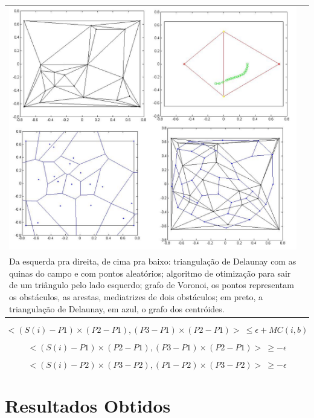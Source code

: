 \documentclass[a4paper,12pt]{article}
\begin{document}
\begin{tabular}{p{15cm} p{7cm}}
    \vspace{0pt} 
    \label{fig: milp}
	\includegraphics[width=1\textwidth]{figures/allmilp.png}
    \vspace{0pt}\\
    Da esquerda pra direita, de cima pra baixo: triangulação de Delaunay com as quinas do campo e com pontos aleatórios; algoritmo de otimização para sair de um triângulo pelo lado esquerdo; grafo de Voronoi, os pontos representam os obstáculos, as arestas, mediatrizes de dois obstáculos; em preto, a triangulação de Delaunay, em azul, o grafo dos centróides. \\
\end{tabular}

\begin{equation}
\label{eq: del1}
<(S(i)-P1)\times(P2-P1),(P3-P1)\times(P2-P1)>\ \leq \epsilon + MC(i,b)
\end{equation}

\begin{equation}
\label{eq: del_par1}
<(S(i)-P1)\times(P2-P1),(P3-P1)\times(P2-P1)>\ \geq -\epsilon
\end{equation}

\begin{equation}
\label{eq: del_par2}
<(S(i)-P2)\times(P3-P2),(P1-P2)\times(P3-P2)>\ \geq -\epsilon
\end{equation}

\section{Resultados Obtidos}
	\label{secao: resultados_obtidos}
    
\end{document}
